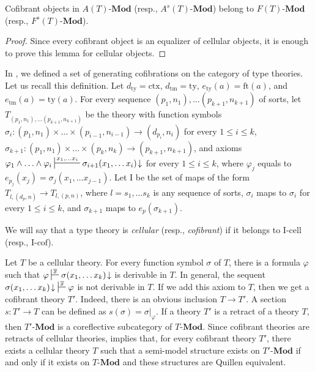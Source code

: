 \documentclass[reqno]{amsart}
\theoremstyle{definition}
\theoremstyle{remark}
\newcommand{\fs}[1]{\mathrm{#1}}
\newcommand{\bcat}[1]{\mathbf{#1}}
\newcommand{\Mod}[1]{#1\text{-}\bcat{Mod}}
\newcommand{\I}{\fs{I}}
\newcommand{\class}[2]{#1\text{-}\mathrm{#2}}
\newcommand{\Icell}[1][\I]{\class{#1}{cell}}
\newcommand{\Icof}[1][\I]{\class{#1}{cof}}
\numberwithin{figure}{section}
\begin{document}
\begin{lem}
Cofibrant objects in $\Mod{A(T)}$ (resp., $\Mod{A^s(T)}$) belong to $\Mod{F(T)}$ (resp., $\Mod{F^s(T)}$).
\end{lem}
\begin{proof}
Since every cofibrant object is an equalizer of cellular objects, it is enough to prove this lemma for cellular objects.
\end{proof}

In \cite{morita-equiv}, we defined a set of generating cofibrations on the category of type theories.
Let us recall this definition.
Let $d_\fs{ty} = \fs{ctx}$, $d_\fs{tm} = \fs{ty}$, $e_\fs{ty}(a) = \fs{ft}(a)$, and $e_\fs{tm}(a) = \fs{ty}(a)$.
For every sequence $(p_1,n_1), \ldots (p_{k+1},n_{k+1})$ of sorts, let $T_{(p_1,n_1), \ldots (p_{k+1},n_{k+1})}$ be the theory
with function symbols $\sigma_i : (p_1,n_1) \times \ldots \times (p_{i-1},n_{i-1}) \to (d_{p_i},n_i)$ for every $1 \leq i \leq k$,
$\sigma_{k+1} : (p_1,n_1) \times \ldots \times (p_k,n_k) \to (p_{k+1},n_{k+1})$,
and axioms $\varphi_1 \land \ldots \land \varphi_i \sststile{}{x_1, \ldots x_i} \sigma_{i+1}(x_1, \ldots x_i)\!\downarrow$ for every $1 \leq i \leq k$,
where $\varphi_j$ equals to $e_{p_j}(x_j) = \sigma_j(x_1, \ldots x_{j-1})$.
Let $\I$ be the set of maps of the form $T_{l, (d_p,n)} \to T_{l, (p,n)}$, where $l = s_1, \ldots s_k$ is any sequence of sorts,
$\sigma_i$ maps to $\sigma_i$ for every $1 \leq i \leq k$, and $\sigma_{k+1}$ maps to $e_p(\sigma_{k+1})$.

\begin{defn}
We will say that a type theory is \emph{cellular} (resp., \emph{cofibrant}) if it belongs to $\Icell$ (resp., $\Icof$).
\end{defn}

Let $T$ be a cellular theory.
For every function symbol $\sigma$ of $T$, there is a formula $\varphi$ such that $\varphi \sststile{}{\overline{x}} \sigma(x_1, \ldots x_k)\!\downarrow$ is derivable in $T$.
In general, the sequent $\sigma(x_1, \ldots x_k)\!\downarrow\ \sststile{}{\overline{x}} \varphi$ is not derivable in $T$.
If we add this axiom to $T$, then we get a cofibrant theory $T'$.
Indeed, there is an obvious inclusion $T \to T'$.
A section $s : T' \to T$ can be defined as $s(\sigma) = \sigma|_\varphi$.
If a theory $T'$ is a retract of a theory $T$, then $\Mod{T'}$ is a coreflective subcategory of $\Mod{T}$.
Since cofibrant theories are retracts of cellular theories,  implies that, for every cofibrant theory $T'$,
there exists a cellular theory $T$ such that a semi-model structure exists on $\Mod{T'}$ if and only if it exists on $\Mod{T}$ and these structures are Quillen equivalent.
\end{document}
